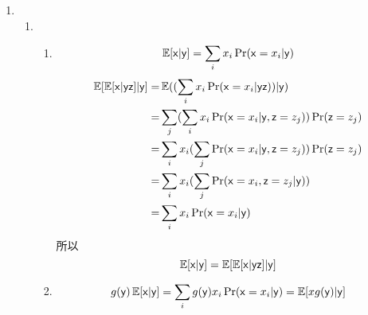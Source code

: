 \documentclass[a4paper]{article}
\begin{document}
\begin{enumerate}[label=\thehwcnt.\arabic*.]
  \setlength{\itemsep}{3\parskip}

  \item 
    \begin{enumerate}[label=(\alph*)]
    \item 
    \begin{enumerate}[label=\roman*.]
      \item 
        \begin{equation}
        \operatorname{\mathbb{E}}[\mathsf{x}|\mathsf{y}]=\sum_{i} x_i\Pr(\mathsf{x}=x_i|\mathsf{y})
        \end{equation}
        \begin{align*}
        \operatorname{\mathbb{E}}[\operatorname{\mathbb{E}}[\mathsf{x}|\mathsf{y} \mathsf{z}]|\mathsf{y}] = & \operatorname{\mathbb{E}}((\sum_{i} x_i \Pr(\mathsf{x}=x_i| \mathsf{y} \mathsf{z}))|\mathsf{y})\\
        =&\sum_j (\sum_{i} x_i \Pr(\mathsf{x}=x_i| \mathsf{y},\mathsf{z}=z_j))\Pr(\mathsf{z}=z_j) \\
        =&\sum_i x_i(\sum_{j} \Pr(\mathsf{x}=x_i| \mathsf{y},\mathsf{z}=z_j))\Pr(\mathsf{z}=z_j) \\
        =&\sum_i x_i(\sum_{j} \Pr(\mathsf{x}=x_i,\mathsf{z}=z_j| \mathsf{y}))\\
        =&\sum_i x_i \Pr(\mathsf{x}=x_i| \mathsf{y}) \\
        \end{align*}
        所以
        \begin{equation}
        \operatorname{\mathbb{E}}[\mathsf{x}|\mathsf{y}]=\operatorname{\mathbb{E}}[\operatorname{\mathbb{E}}[\mathsf{x}|\mathsf{y} \mathsf{z}]|\mathsf{y}]
        \end{equation}

      \item 
        \begin{equation}
        g(\mathsf{y})\operatorname{\mathbb{E}}[\mathsf{x}|\mathsf{y}]=\sum_{i} g(\mathsf{y})x_i\Pr(\mathsf{x}=x_i|\mathsf{y})=\operatorname{\mathbb{E}}[xg(\mathsf{y})|\mathsf{y}]
        \end{equation}
      

\end{enumerate}
\end{enumerate}
\end{enumerate}
\end{document}
